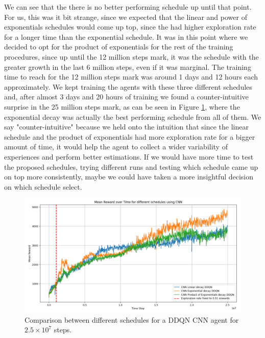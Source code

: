 We can see that the there is no better performing schedule up until that point. For us, this was it bit strange, since we expected that the linear and power of exponentials schedules would come up top, since the had higher exploration rate for a longer time than the exponential schedule. It was in this point where we decided to opt for the product of exponentials for the rest of the training procedures, since up until the 12 million steps mark, it was the schedule with the greater growth in the last 6 million steps, even if it was marginal. The training time to reach for the 12 million steps mark was around 1 days and 12 hours each approximately. We kept training the agents with these three different schedules and, after almost 3 days and 20 hours of training we found a counter-intuitive surprise in the 25 million steps mark, as can be seen in Figure \ref{fig:compsch25m}, where the exponential decay was actually the best performing schedule from all of them. We say "counter-intuitive" because we held onto the intuition that since the linear schedule and the product of exponentials had more exploration rate for a bigger amount of time, it would help the agent to collect a wider variability of experiences and perform better estimations. If we would have more time to test the proposed schedules, trying different runs and testing which schedule came up on top more consistently, maybe we could have taken a more insightful decision on which schedule select.

\begin{figure}[!h]
	\centering
	\includegraphics[width=\linewidth]{figures/comp_sch_25M}
	\caption{Comparison between different schedules for a DDQN CNN agent for $2.5 \times10^7$ steps.}
	\label{fig:compsch25m}
\end{figure}

